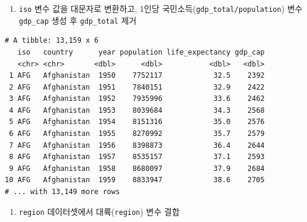 \documentclass[
  11pt,
]{krantz}
\newenvironment{Shaded}{\begin{snugshade}}{\end{snugshade}}
\newcommand{\DataTypeTok}[1]{\textcolor[rgb]{0.27,0.27,0.27}{#1}}
\newcommand{\KeywordTok}[1]{\textcolor[rgb]{0.27,0.27,0.27}{\textbf{#1}}}
\newcommand{\NormalTok}[1]{#1}
\newcommand{\OperatorTok}[1]{\textcolor[rgb]{0.43,0.43,0.43}{\textbf{#1}}}
\newcommand{\StringTok}[1]{\textcolor[rgb]{0.5,0.5,0.5}{#1}}
\providecommand{\tightlist}{%
  \setlength{\itemsep}{0pt}\setlength{\parskip}{0pt}}
\begin{document}
\normalsize

\begin{enumerate}
\def\labelenumi{\arabic{enumi}.}
\setcounter{enumi}{3}
\tightlist
\item
  \texttt{iso} 변수 값을 대문자로 변환하고, 1인당 국민소득(\texttt{gdp\_total/population}) 변수 \texttt{gdp\_cap} 생성 후 \texttt{gdp\_total} 제거
\end{enumerate}

\footnotesize

\begin{Shaded}
\end{Shaded}

\begin{verbatim}
# A tibble: 13,159 x 6
   iso   country      year population life_expectancy gdp_cap
   <chr> <chr>       <dbl>      <dbl>           <dbl>   <dbl>
 1 AFG   Afghanistan  1950    7752117            32.5    2392
 2 AFG   Afghanistan  1951    7840151            32.9    2422
 3 AFG   Afghanistan  1952    7935996            33.6    2462
 4 AFG   Afghanistan  1953    8039684            34.3    2568
 5 AFG   Afghanistan  1954    8151316            35.0    2576
 6 AFG   Afghanistan  1955    8270992            35.7    2579
 7 AFG   Afghanistan  1956    8398873            36.4    2644
 8 AFG   Afghanistan  1957    8535157            37.1    2593
 9 AFG   Afghanistan  1958    8680097            37.9    2684
10 AFG   Afghanistan  1959    8833947            38.6    2705
# ... with 13,149 more rows
\end{verbatim}

\normalsize

\begin{enumerate}
\def\labelenumi{\arabic{enumi}.}
\setcounter{enumi}{4}
\tightlist
\item
  \texttt{region} 데이터셋에서 대륙(\texttt{region}) 변수 결합
\end{enumerate}
\end{document}
